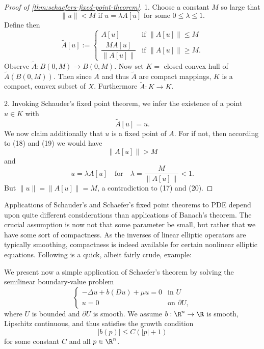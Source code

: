 \begin{proof}[Proof of \cref{thm:schaefers-fixed-point-theorem}]
1. Choose a constant $M$ so large that
\[
\|u\| < M \text{ if } u = \lambda A[u] \text{ for some } 0 \le \lambda \le 1.
\tag{17}
\]
Define then
\[
\tilde{A}[u] := \begin{cases} A[u] & \text{if } \|A[u]\| \le M \\ \dfrac{MA[u]}{\|A[u]\|} & \text{if } \|A[u]\| \ge M. \end{cases}
\tag{18}
\]
Observe $\tilde{A} : B(0,M) \to B(0,M)$. Now set $K = $ closed convex hull of $\tilde{A}(B(0,M))$. Then since $A$ and thus $\tilde{A}$ are compact mappings, $K$ is a compact, convex subset of $X$. Furthermore $\tilde{A} : K \to K$.

2. Invoking Schauder's fixed point theorem, we infer the existence of a point $u \in K$ with
\[
\tilde{A}[u] = u.
\tag{19}
\]
We now claim additionally that $u$ is a fixed point of $A$. For if not, then according to (18) and (19) we would have
\[
\|A[u]\| > M
\]
and
\[
u = \lambda A[u] \quad \text{for} \quad \lambda = \frac{M}{\|A[u]\|} < 1.
\tag{20}
\]
But $\|u\| = \|A[u]\| = M$, a contradiction to (17) and (20).
\end{proof}

Applications of Schauder's and Schaefer's fixed point theorems to PDE depend upon quite different considerations than applications of Banach's theorem. The crucial assumption is now not that some parameter be small, but rather that we have some sort of compactness. As the inverses of linear elliptic operators are typically smoothing, compactness is indeed available for certain nonlinear elliptic equations. Following is a quick, albeit fairly crude, example:

\begin{example}
\label{ex:quasilinear-elliptic-schaefer}
We present now a simple application of Schaefer's theorem by solving the semilinear boundary-value problem
\[
\begin{cases}
-\Delta u + b(Du) + \mu u = 0 & \text{in } U \\
u = 0 & \text{on } \partial U,
\end{cases}
\tag{21}
\]
where $U$ is bounded and $\partial U$ is smooth. We assume $b : \R^n \to \R$ is smooth, Lipschitz continuous, and thus satisfies the growth condition
\[
|b(p)| \le C(|p| + 1)
\tag{22}
\]
for some constant $C$ and all $p \in \R^n$.
\end{example}

